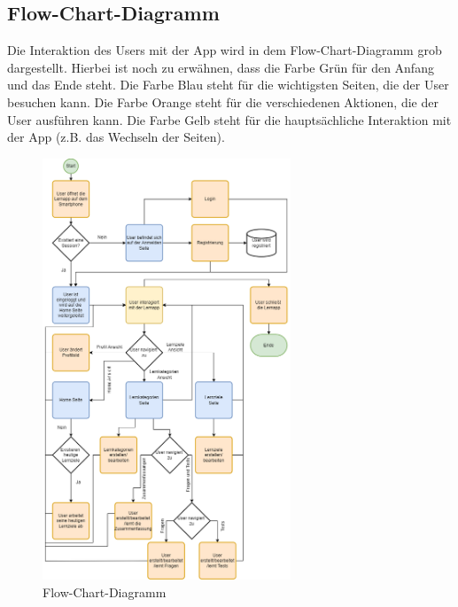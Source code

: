 \subsection{Flow-Chart-Diagramm}
Die Interaktion des Users mit der App wird in dem Flow-Chart-Diagramm grob dargestellt. Hierbei ist noch zu erwähnen, dass die Farbe Grün für den Anfang und das Ende steht. Die Farbe Blau steht für die wichtigsten Seiten, die der User besuchen kann. Die Farbe Orange steht für die verschiedenen Aktionen, die der User ausführen kann. Die Farbe Gelb steht für die hauptsächliche Interaktion mit der App (z.B. das Wechseln der Seiten).
\begin{figure}[H]
  \centering
  \includegraphics[width=0.66\textwidth]{images/diagramme/FlowChartDiagramm.png}
  \caption{Flow-Chart-Diagramm}
  \label{fig:FlowChart}
\end{figure}\noindent